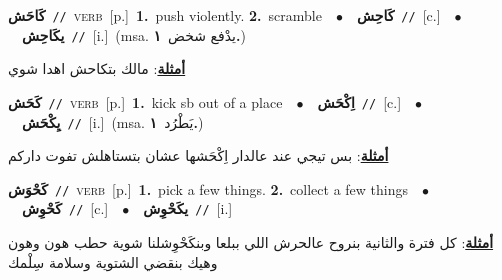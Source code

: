 \documentclass[10pt,a4paper,twoside]{article} %
\begin{document}
\begin{multicols}{2}
{\setlength\topsep{0pt}\textbf{\foreignlanguage{arabic}{كَاحَش}}\ {\color{gray}\texttt{//}\color{black}}\ \textsc{verb}\ [p.]\ \textbf{1.}~push violently.  \textbf{2.}~scramble\ \ $\bullet$\ \ \setlength\topsep{0pt}\textbf{\foreignlanguage{arabic}{كَاحِش}}\ {\color{gray}\texttt{//}\color{black}}\ [c.]\ \ $\bullet$\ \ \setlength\topsep{0pt}\textbf{\foreignlanguage{arabic}{يكَاحِش}}\ {\color{gray}\texttt{//}\color{black}}\ [i.]\ \color{gray}(msa. \foreignlanguage{arabic}{يدْفع شخض}~\foreignlanguage{arabic}{\textbf{١.}})\color{black}\  \begin{flushright}\color{gray}\foreignlanguage{arabic}{\textbf{\underline{\foreignlanguage{arabic}{أمثلة}}}: مالك بتكاحش اهدا شوي}\end{flushright}\color{black}} \vspace{2mm}

{\setlength\topsep{0pt}\textbf{\foreignlanguage{arabic}{كَحَش}}\ {\color{gray}\texttt{//}\color{black}}\ \textsc{verb}\ [p.]\ \textbf{1.}~kick sb out of a place\ \ $\bullet$\ \ \setlength\topsep{0pt}\textbf{\foreignlanguage{arabic}{اِكْحَش}}\ {\color{gray}\texttt{//}\color{black}}\ [c.]\ \ $\bullet$\ \ \setlength\topsep{0pt}\textbf{\foreignlanguage{arabic}{يِكْحَش}}\ {\color{gray}\texttt{//}\color{black}}\ [i.]\ \color{gray}(msa. \foreignlanguage{arabic}{يَطْرُد}~\foreignlanguage{arabic}{\textbf{١.}})\color{black}\  \begin{flushright}\color{gray}\foreignlanguage{arabic}{\textbf{\underline{\foreignlanguage{arabic}{أمثلة}}}: بس تيجي عند عالدار اِكْحَشها عشان بتستاهلش تفوت داركم}\end{flushright}\color{black}} \vspace{2mm}

{\setlength\topsep{0pt}\textbf{\foreignlanguage{arabic}{كَحْوَش}}\ {\color{gray}\texttt{//}\color{black}}\ \textsc{verb}\ [p.]\ \textbf{1.}~pick a few things.  \textbf{2.}~collect a few things\ \ $\bullet$\ \ \setlength\topsep{0pt}\textbf{\foreignlanguage{arabic}{كَحْوِش}}\ {\color{gray}\texttt{//}\color{black}}\ [c.]\ \ $\bullet$\ \ \setlength\topsep{0pt}\textbf{\foreignlanguage{arabic}{يكَحْوِش}}\ {\color{gray}\texttt{//}\color{black}}\ [i.]\  \begin{flushright}\color{gray}\foreignlanguage{arabic}{\textbf{\underline{\foreignlanguage{arabic}{أمثلة}}}: كل فترة والثانية بنروح عالحرش اللي ببلعا وبنكَحْوِشلنا شوية حطب هون وهون وهيك بنقضي الشتوية وسلامة سِلْمك}\end{flushright}\color{black}} \vspace{2mm}


\end{multicols}
\end{document}
